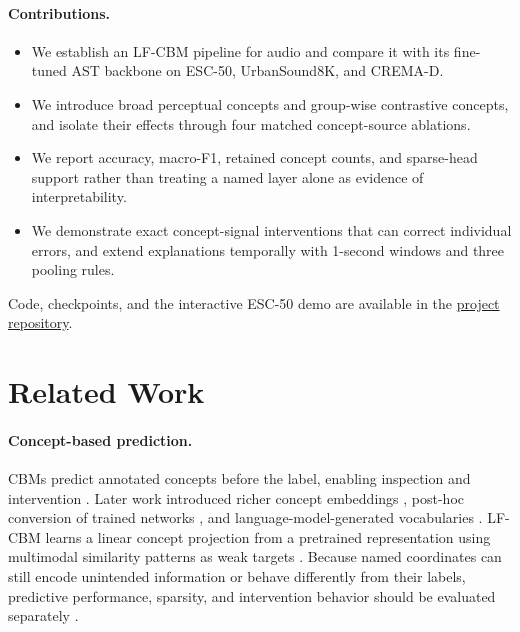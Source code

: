 \documentclass[10pt]{article}
\begin{document}
\paragraph{Contributions.}
\begin{itemize}
    \item We establish an LF-CBM pipeline for audio and compare it with its fine-tuned AST backbone on ESC-50, UrbanSound8K, and CREMA-D.
    \item We introduce broad perceptual concepts and group-wise contrastive concepts, and isolate their effects through four matched concept-source ablations.
    \item We report accuracy, macro-F1, retained concept counts, and sparse-head support rather than treating a named layer alone as evidence of interpretability.
    \item We demonstrate exact concept-signal interventions that can correct individual errors, and extend explanations temporally with 1-second windows and three pooling rules.
\end{itemize}
Code, checkpoints, and the interactive ESC-50 demo are available in the \href{https://github.com/Adam-Ousse/Label-free-CBM-Audio}{project repository}.

\section{Related Work}
\paragraph{Concept-based prediction.}
CBMs predict annotated concepts before the label, enabling inspection and intervention \citep{koh2020concept}. Later work introduced richer concept embeddings \citep{zarlenga2022cem}, post-hoc conversion of trained networks \citep{yuksekgonul2023posthoc}, and language-model-generated vocabularies \citep{yang2023labo}. LF-CBM learns a linear concept projection from a pretrained representation using multimodal similarity patterns as weak targets \citep{oikarinen2023labelfree}. Because named coordinates can still encode unintended information or behave differently from their labels, predictive performance, sparsity, and intervention behavior should be evaluated separately \citep{margeloiu2021intended,almudevar2025bottleneck}.
\end{document}
